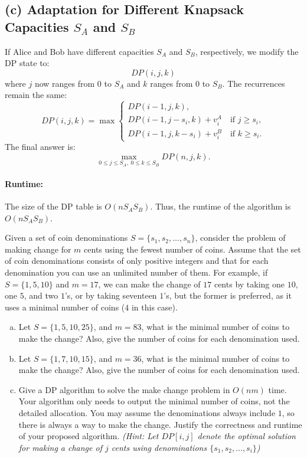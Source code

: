 \documentclass[11pt]{article}
\begin{document}
    \subsection*{(c) Adaptation for Different Knapsack Capacities \(S_A\) and \(S_B\)}
    If Alice and Bob have different capacities \(S_A\) and \(S_B\), respectively, we modify the DP state to:
    \[
    DP(i,j,k)
    \]
    where \(j\) now ranges from \(0\) to \(S_A\) and \(k\) ranges from \(0\) to \(S_B\). The recurrences remain the same:
    \[
    DP(i,j,k) = \max \begin{cases}
    DP(i-1, j, k), \\[1mm]
    DP(i-1, j-s_i, k) + v_i^A \quad \text{if } j \ge s_i, \\[1mm]
    DP(i-1, j, k-s_i) + v_i^B \quad \text{if } k \ge s_i.
    \end{cases}
    \]
    The final answer is:
    \[
    \max_{0\le j\le S_A,\;0\le k\le S_B} DP(n,j,k).
    \]
    
    \paragraph{Runtime:}
    The size of the DP table is \(O(nS_A S_B)\). Thus, the runtime of the algorithm is \(O(nS_A S_B)\).
    

    \newpage

    \begin{tcolorbox}[title={Problem 2 (Make Change, 50 points)}] \setlength\parindent{1em}
        
     Given a set of coin denominations $S=\{s_1, s_2,\dots, s_n\}$, consider the problem of making change for $m$ cents using the fewest
        number of coins. Assume that the set of coin denominations consists of only positive integers and that for each denomination you can use an unlimited number of them. For example, if $S=\{1, 5, 10\}$ and $m=17$, we can make the change of $17$ cents by taking one $10$, one $5$, and two $1$'s, or by taking seventeen $1$'s, but the former is preferred, as it uses a minimal number of coins ($4$ in this case).

    \begin{enumerate}[(a)]
    \item Let $S=\{1, 5, 10, 25\}$, and $m=83$, what is the minimal number of coins to make the change? Also, give the number of coins for each denomination used.
    \item Let $S=\{1, 7, 10, 15\}$, and $m=36$, what is the minimal number of coins to make the change? Also, give the number of coins for each denomination used.
    \item Give a DP algorithm to solve the make change problem in $O(nm)$ time. Your algorithm only needs to output the minimal number of coins, not the detailed allocation. You may assume the denominations always include $1$, so there is always a way to make the change. Justify the correctness and runtime of your proposed algorithm. \textit{(Hint: Let $DP[i,j]$ denote the optimal solution for making a change of $j$ cents using denominations $\{s_1, s_2, \dots, s_i\}$)}
    \end{enumerate}
    \end{tcolorbox}
    
    
    \newpage

    
    
\end{document}
